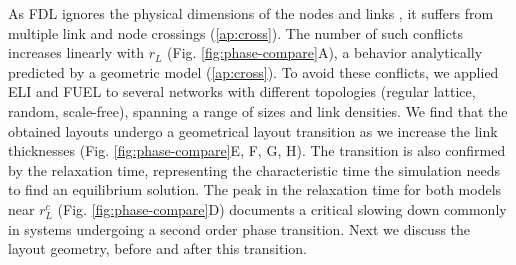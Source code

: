 \documentclass[endfloats,nofootinbib,preprint,floatfix,titlepage,superscriptaddress,linenumbers]{revtex4-1} %
\begin{document}
As FDL ignores the physical dimensions of the nodes and links%
, it suffers from multiple link and node crossings (\ref{ap:cross}). %
The number of such conflicts increases linearly with $r_L$ (Fig. \ref{fig:phase-compare}A), a behavior analytically predicted by a geometric model (\ref{ap:cross}). %
To avoid these conflicts, we applied ELI and FUEL to several networks with different topologies (regular lattice, random, scale-free), spanning a range of sizes and link densities. 
We find that the obtained layouts undergo a geometrical layout transition as we increase the link thicknesses (Fig. \ref{fig:phase-compare}E, F, G, H). 
The transition is also confirmed by the relaxation time, representing the characteristic time the simulation needs to find an equilibrium solution. The peak in the relaxation time for both models near $r_L^c$ (Fig. \ref{fig:phase-compare}D)
documents a critical slowing down commonly in systems undergoing a second order phase transition. 
Next we discuss the layout geometry, before and after this transition.%
\end{document}
